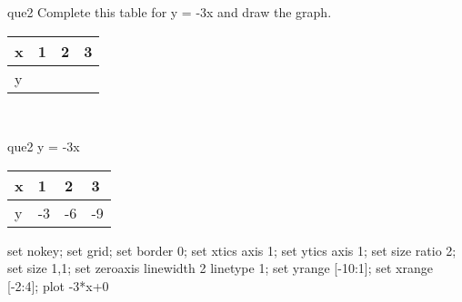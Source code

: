 \documentclass[13.5pt, varwidth=true]{beamer}
\begin{document}
\begin{frame}[shrink=19,fragile]
	\begin{beamercolorbox}[rounded=true, left, shadow=true,wd=14.8cm]{que2}
		 Complete this table for y = -3x and draw the graph. \\[0.3cm] \renewcommand{\arraystretch}{1.2}\begin{tabular}{|C|C|C|C|} \hline x & 1 & 2 & 3 \\ \hline y & & & \\ \hline \end{tabular}\\[0.3cm]
	\end{beamercolorbox}
\end{frame}
\begin{frame}[shrink=19,fragile]
	\begin{beamercolorbox}[rounded=true, left, shadow=true,wd=14.8cm]{que2}
		y = -3x\renewcommand{\arraystretch}{1.2}\begin{tabular}{|C|C|C|C|} \hline x & 1 & 2 & 3 \\ \hline y & -3 & -6 & -9\\ \hline \end{tabular}\begin{gnuplot}[terminal=pdf] set nokey; set grid; set border 0; set xtics axis 1; set ytics axis 1; set size ratio 2; set size 1,1; set zeroaxis linewidth 2 linetype 1; set yrange [-10:1]; set xrange [-2:4]; plot -3*x+0 \end{gnuplot}
	\end{beamercolorbox}
\end{frame}
\end{document}

